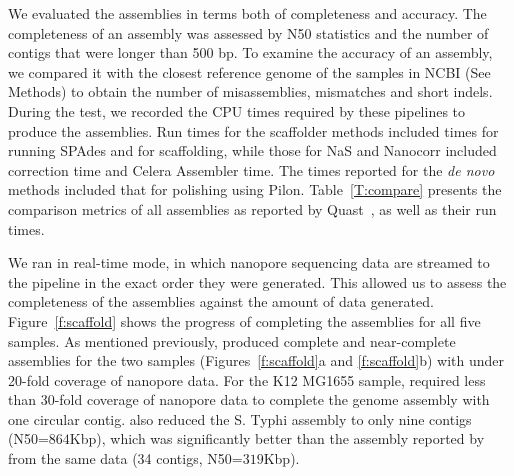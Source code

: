 We evaluated the assemblies in terms both of completeness and accuracy.
The completeness of an assembly was assessed by N50 statistics and the
number of contigs that were longer than 500 bp. To examine the accuracy of an
assembly, we compared it with the closest reference genome of the samples in
NCBI (See Methods) to obtain the number of misassemblies, mismatches and
short indels.
During the test, we recorded the CPU times
required by these pipelines to produce the assemblies. Run times for
the scaffolder methods included times for running SPAdes and for scaffolding,
while those for NaS and Nanocorr included correction time and Celera
Assembler time.
The times reported for the \emph{de novo} methods included that for
polishing using Pilon.
Table~\ref{T:compare} presents the comparison metrics of all assemblies as 
reported by Quast~\cite{GurevichSV2013}, as well as their run times. 
 
We ran \npscarf{} in real-time mode, in which nanopore sequencing data are
streamed to the pipeline in the exact order they were generated.
This allowed us to assess the completeness of the assemblies against the 
amount of data generated.
Figure~\ref{f:scaffold} shows the progress of completing the assemblies
for all five samples. As mentioned previously, \npscarf{} produced complete and
near-complete assemblies for the two \kp{} samples (Figures~\ref{f:scaffold}a
and \ref{f:scaffold}b) with under 20-fold coverage of nanopore data.
For the \ec{} K12 MG1655 sample, \npscarf{} required less than 30-fold coverage of 
nanopore data to complete the genome assembly with one circular contig.
\npscarf{} also reduced the S. Typhi assembly to only nine contigs (N50=$864$Kbp),
which was significantly better than the assembly reported by~\cite{AshtonND2015} 
from the same data (34 contigs, N50=$319$Kbp).

